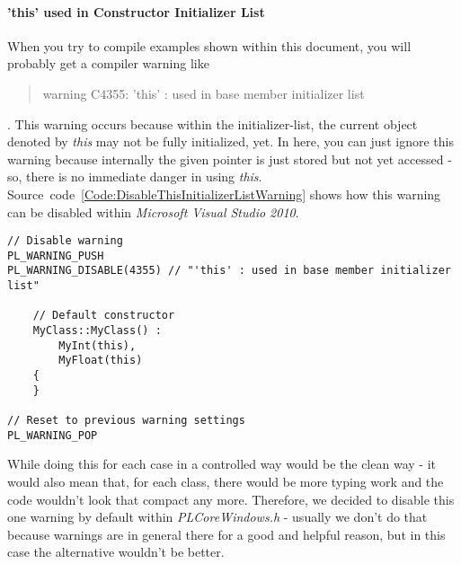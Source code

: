\paragraph{'this' used in Constructor Initializer List}
When you try to compile examples shown within this document, you will probably get a compiler warning like \begin{quote}warning C4355: 'this' : used in base member initializer list\end{quote}. This warning occurs because within the initializer-list, the current object denoted by \emph{this} may not be fully initialized, yet. In here, you can just ignore this warning because internally the given pointer is just stored but not yet accessed - so, there is no immediate danger in using \emph{this}. Source~code~\ref{Code:DisableThisInitializerListWarning} shows how this warning can be disabled within \emph{Microsoft Visual Studio 2010}.
\begin{lstlisting}[float=htb,label=Code:DisableThisInitializerListWarning,caption={Disable warning when using \emph{this} within the initializer list}]
// Disable warning
PL_WARNING_PUSH
PL_WARNING_DISABLE(4355) // "'this' : used in base member initializer list"

	// Default constructor
	MyClass::MyClass() :
		MyInt(this),
		MyFloat(this)
	{
	}

// Reset to previous warning settings
PL_WARNING_POP
\end{lstlisting}
While doing this for each case in a controlled way would be the clean way - it would also mean that, for each class, there would be more typing work and the code wouldn't look that compact any more. Therefore, we decided to disable this one warning by default within \emph{PLCoreWindows.h} - usually we don't do that because warnings are in general there for a good and helpful reason, but in this case the alternative wouldn't be better.




